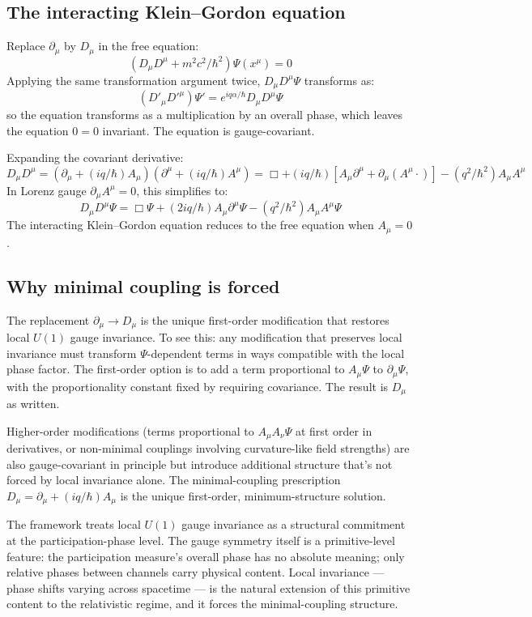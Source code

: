 \documentclass[11pt,a4paper]{article}
\begin{document}
\subsection{The interacting Klein--Gordon equation}

Replace $\partial_\mu$ by $D_\mu$ in the free equation:
\[
(D_\mu D^\mu + m^{2}c^{2}/\hbar^{2})\Psi(x^\mu) = 0
\]
Applying the same transformation argument twice, $D_\mu D^\mu\Psi$ transforms as:
\[
(D'_\mu D'^\mu)\Psi' = e^{iq\alpha/\hbar}D_\mu D^\mu\Psi
\]
so the equation transforms as a multiplication by an overall phase, which leaves the equation $0 = 0$ invariant. The equation is gauge-covariant.

Expanding the covariant derivative:
\[
D_\mu D^\mu = (\partial_\mu + (iq/\hbar)A_\mu)(\partial^\mu + (iq/\hbar)A^\mu) = \Box + (iq/\hbar)[A_\mu\partial^\mu + \partial_\mu(A^\mu \cdot)] - (q^{2}/\hbar^{2})A_\mu A^\mu
\]
In Lorenz gauge $\partial_\mu A^\mu = 0$, this simplifies to:
\[
D_\mu D^\mu\Psi = \Box\Psi + (2iq/\hbar)A_\mu\partial^\mu\Psi - (q^{2}/\hbar^{2})A_\mu A^\mu\Psi
\]
The interacting Klein--Gordon equation reduces to the free equation when $A_\mu = 0$.

\subsection{Why minimal coupling is forced}

The replacement $\partial_\mu \to D_\mu$ is the unique first-order modification that restores local $U(1)$ gauge invariance. To see this: any modification that preserves local invariance must transform $\Psi$-dependent terms in ways compatible with the local phase factor. The first-order option is to add a term proportional to $A_\mu\Psi$ to $\partial_\mu\Psi$, with the proportionality constant fixed by requiring covariance. The result is $D_\mu$ as written.

Higher-order modifications (terms proportional to $A_\mu A_\nu\Psi$ at first order in derivatives, or non-minimal couplings involving curvature-like field strengths) are also gauge-covariant in principle but introduce additional structure that's not forced by local invariance alone. The minimal-coupling prescription $D_\mu = \partial_\mu + (iq/\hbar)A_\mu$ is the unique first-order, minimum-structure solution.

The framework treats local $U(1)$ gauge invariance as a structural commitment at the participation-phase level. The gauge symmetry itself is a primitive-level feature: the participation measure's overall phase has no absolute meaning; only relative phases between channels carry physical content. Local invariance --- phase shifts varying across spacetime --- is the natural extension of this primitive content to the relativistic regime, and it forces the minimal-coupling structure.
\end{document}
